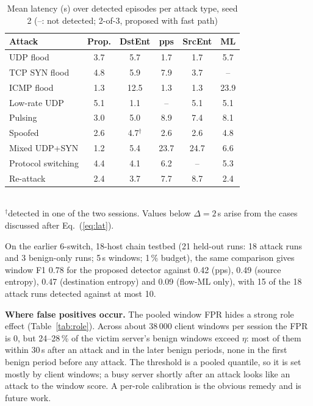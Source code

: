 \documentclass[conference]{IEEEtran}
\begin{document}
\begin{table}[t]
\caption{Mean latency (s) over detected episodes per attack type, seed 2 (--: not detected; 2-of-3, proposed with fast path)}
\label{tab:types}
\centering
\setlength{\tabcolsep}{3pt}
\begin{tabular}{lccccc}
\toprule
Attack & Prop. & DstEnt & pps & SrcEnt & ML \\
\midrule
UDP flood & 3.7 & 5.7 & 1.7 & 1.7 & 5.7 \\
TCP SYN flood & 4.8 & 5.9 & 7.9 & 3.7 & -- \\
ICMP flood & 1.3 & 12.5 & 1.3 & 1.3 & 23.9 \\
Low-rate UDP & 5.1 & 1.1 & -- & 5.1 & 5.1 \\
Pulsing & 3.0 & 5.0 & 8.9 & 7.4 & 8.1 \\
Spoofed & 2.6 & 4.7$^\dagger$ & 2.6 & 2.6 & 4.8 \\
Mixed UDP+SYN & 1.2 & 5.4 & 23.7 & 24.7 & 6.6 \\
Protocol switching & 4.4 & 4.1 & 6.2 & -- & 5.3 \\
Re-attack & 2.4 & 3.7 & 7.7 & 8.7 & 2.4 \\
\bottomrule
\end{tabular}\\[2pt]
\footnotesize $^\dagger$detected in one of the two sessions. Values below $\Delta=2$\,s arise from the cases discussed after Eq.~(\ref{eq:lat}).
\end{table}

On the earlier 6-switch, 18-host chain testbed (21 held-out runs: 18 attack runs and 3 benign-only runs; 5\,s windows; 1\,\% budget), the same comparison gives window F1 0.78 for the proposed detector against 0.42 (pps), 0.49 (source entropy), 0.47 (destination entropy) and 0.09 (flow-ML only), with 15 of the 18 attack runs detected against at most 10.

\textbf{Where false positives occur.} The pooled window FPR hides a strong role effect (Table~\ref{tab:role}). Across about 38\,000 client windows per session the FPR is 0, but 24--28\,\% of the victim server's benign windows exceed $\eta$: most of them within 30\,s after an attack and in the later benign periods, none in the first benign period before any attack. The threshold is a pooled quantile, so it is set mostly by client windows; a busy server shortly after an attack looks like an attack to the window score. A per-role calibration is the obvious remedy and is future work.
\end{document}
